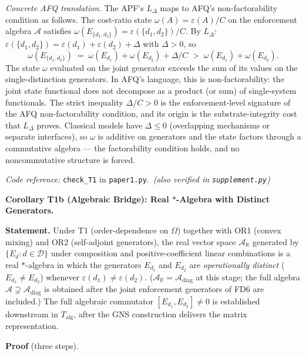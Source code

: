 \documentclass[11pt]{article}
\theoremstyle{remark}
\newcommand{\coderef}[2]{\smallskip\noindent\textit{Code reference:} \texttt{#1} in \texttt{#2}.}
\begin{document}
\begin{tcolorbox}[apfbox, title={Theorem T1 --- The Bridge Theorem (Order-Dependence)}]
\smallskip\noindent\textit{Concrete AFQ translation.}  The APF's $L_\Delta$ maps to AFQ's non-factorability condition as follows.  The cost-ratio state $\omega(A) = \varepsilon(A)/C$ on the enforcement algebra $\mathcal{A}$ satisfies $\omega(E_{\{d_1,d_2\}}) = \varepsilon(\{d_1,d_2\})/C$.  By $L_\Delta$: $\varepsilon(\{d_1,d_2\}) = \varepsilon(d_1) + \varepsilon(d_2) + \Delta$ with $\Delta > 0$, so
\[
\omega(E_{\{d_1,d_2\}}) \;=\; \omega(E_{d_1}) + \omega(E_{d_2}) + \Delta/C \;>\; \omega(E_{d_1}) + \omega(E_{d_2}).
\]
The state $\omega$ evaluated on the joint generator exceeds the sum of its values on the single-distinction generators.  In AFQ's language, this is non-factorability: the joint state functional does not decompose as a product (or sum) of single-system functionals.  The strict inequality $\Delta/C > 0$ is the enforcement-level signature of the AFQ non-factorability condition, and its origin is the substrate-integrity cost that $L_\Delta$ proves.  Classical models have $\Delta \le 0$ (overlapping mechanisms or separate interfaces), so $\omega$ is additive on generators and the state factors through a commutative algebra --- the factorability condition holds, and no noncommutative structure is forced.

\coderef{check\_T1}{paper1.py}\,%
\hspace{1em}\textit{(also verified in \texttt{supplement.py})}
\end{tcolorbox}


\medskip\noindent\textbf{Corollary T1b (Algebraic Bridge): Real $*$-Algebra with Distinct Generators.}

\textbf{Statement.}  Under T1 (order-dependence on $\Omega$) together with OR1 (convex mixing) and OR2 (self-adjoint generators), the real vector space $\mathcal{A}_\mathbb{R}$ generated by $\{E_d : d \in \mathcal{D}\}$ under composition and positive-coefficient linear combinations is a real $*$-algebra in which the generators $E_{d_1}$ and $E_{d_2}$ are \emph{operationally distinct} ($E_{d_1} \ne E_{d_2}$) whenever $\varepsilon(d_1) \ne \varepsilon(d_2)$.  ($\mathcal{A}_\mathbb{R} = \mathcal{A}_{\mathrm{diag}}$ at this stage; the full algebra $\mathcal{A} \supsetneq \mathcal{A}_{\mathrm{diag}}$ is obtained after the joint enforcement generators of FD6 are included.)  The full algebraic commutator $[E_{d_1}, E_{d_2}] \ne 0$ is established downstream in $T_{\mathrm{alg}}$, after the GNS construction delivers the matrix representation.

\smallskip\noindent\textbf{Proof} (three steps).
\end{document}
